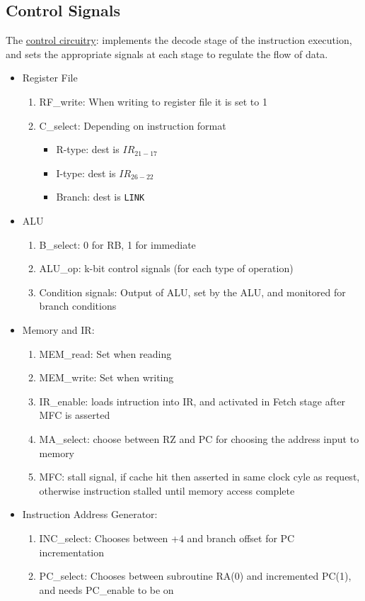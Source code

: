 \documentclass[10pt]{article}
\begin{document}
\subsection{Control Signals}
The \underline{control circuitry}: implements the decode stage of the instruction execution, and sets the appropriate signals at each stage to regulate the flow of data.
\begin{itemize}
    \item Register File
    \begin{enumerate}
        \item RF\_write: When writing to register file it is set to 1
        \item C\_select: Depending on instruction format
        \begin{itemize}
            \item R-type: dest is $IR_{21-17}$
            \item I-type: dest is $IR_{26-22}$ \item Branch: dest is \texttt{LINK}
        \end{itemize}
    \end{enumerate}
    \item ALU
    \begin{enumerate}
        \item B\_select: 0 for RB, 1 for immediate
        \item ALU\_op: k-bit control signals (for each type of operation)
        \item Condition signals: Output of ALU, set by the ALU, and monitored for branch conditions
    \end{enumerate}
    \item Memory and IR:
    \begin{enumerate}
        \item MEM\_read: Set when reading
        \item MEM\_write: Set when writing
        \item IR\_enable: loads intruction into IR, and activated in Fetch stage after MFC is asserted
        \item MA\_select: choose between RZ and PC for choosing the address input to memory
        \item MFC: stall signal, if cache hit then asserted in same clock cyle as request, otherwise instruction stalled until memory access complete
    \end{enumerate}
    \item Instruction Address Generator:
    \begin{enumerate}
        \item INC\_select: Chooses between +4 and branch offset for PC incrementation
        \item PC\_select: Chooses between subroutine RA(0) and incremented PC(1), and needs PC\_enable to be on
    \end{enumerate}
\end{itemize}
\end{document}

